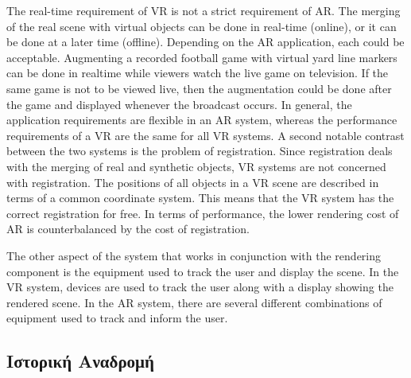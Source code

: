 The real-time requirement of VR is not a strict requirement of AR. The merging of the real scene with virtual objects can be done in real-time (online), or it can be done at a later time (offline). Depending on the AR application, each could be acceptable. Augmenting a recorded football game with virtual yard line markers can be done in realtime while viewers watch the live game on television. If the same game is not to be viewed live, then the augmentation could be done after the game and displayed whenever the broadcast occurs. In general, the application requirements are flexible in an AR system, whereas the performance requirements of a VR are the same for all VR systems. A second notable contrast between the two systems is the problem of registration. Since registration deals with the merging of real and synthetic objects, VR systems are not concerned with registration. The positions of all objects in a VR scene are described in terms of a common coordinate system. This means that the VR system has the correct registration for free. In terms of performance, the lower rendering cost of AR is counterbalanced by the cost of registration.

The other aspect of the system that works in conjunction with the rendering component is the equipment used to track the user and display the scene. In the VR system, devices are used to track the user along with a display showing the rendered scene. In the AR system, there are several different combinations of equipment used to track and inform the user.


\subsection{Ιστορική Αναδρομή}


